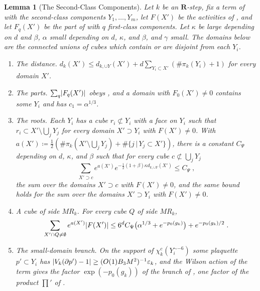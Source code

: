 \documentclass[11pt]{preprint}
\DeclarePairedDelimiter{\abs}{\lvert}{\rvert}
\numberwithin{equation}{section}
\newtheorem{lemma}{Lemma}[section]
\theoremstyle{definition}
\theoremstyle{remark}
\theoremstyle{plain}
\begin{document}
\begin{lemma}[The Second-Class Components]\label{lem:second-class}
Let $k$ be an $\mathbf R$-step, fix a term of \cite[(1.72), p.~379]{BalabanLFR2} with the second-class components $Y_1, \dots, Y_m$, let $F(X')$ be the activities of \cite[(1.91), p.~388]{BalabanLFR2}, and let $F_q(X')$ be the part of \cite[(1.91)]{BalabanLFR2} with $q$ first-class components. Let $\kappa$ be large depending on $d$ and $\beta$, $\alpha$ small depending on $d$, $\kappa$, and $\beta$, and $\gamma$ small. The domains below are the connected unions of cubes which contain or are disjoint from each $Y_i$.
\begin{enumerate}[label=(\roman*)]
\item \emph{The distance.} $d_k(X') \leq d_{k,\cup Y}(X') + d\sum_{Y_i \subset X'}(\#\pi_k(Y_i) + 1)$ for every domain $X'$.
\item \emph{The parts.} $\sum_q\abs{F_q(X')}$ obeys \cite[(1.97)]{BalabanLFR2}, and a domain with $F_0(X') \neq 0$ contains some $Y_i$ and has $c_1 = \alpha^{1/3}$.
\item \emph{The roots.} Each $Y_i$ has a cube $r_i \not\subset Y_i$ with a face on $Y_i$ such that $r_i \subset X' \setminus \bigcup_jY_j$ for every domain $X' \supset Y_i$ with $F(X') \neq 0$. With $a(X') \coloneqq \frac12(\#\pi_k(X' \setminus \bigcup_jY_j) + \#\{j \,|\, Y_j \subset X'\})$, there is a constant $C_\Psi$ depending on $d$, $\kappa$, and $\beta$ such that for every cube $c \not\subset \bigcup_jY_j$
\begin{equation}\label{eq:second-class-roots}
    \sum_{X' \supset c}e^{a(X')}e^{-\frac12(1+\beta)\kappa d_{k,\cup Y}(X')} \leq C_\Psi\;,
\end{equation}
the sum over the domains $X' \supset c$ with $F(X') \neq 0$, and the same bound holds for the sum over the domains $X' \supset Y_i$ with $F(X') \neq 0$.
\item \emph{A cube of side $MR_k$.} For every cube $Q$ of side $MR_k$,
\begin{equation}\label{eq:second-class-cube}
    \sum_{X' \cap Q \neq \emptyset}e^{a(X')}\abs{F(X')} \leq 6^dC_\Psi\bigl(\alpha^{1/3} + e^{-p_0(g_k)}\bigr) + e^{-p_0(g_k)/2}\;.
\end{equation}
\item \emph{The small-domain branch.} On the support of $\chi^c_k(Y_i^{\sim-6})$ some plaquette $p' \subset Y_i$ has $\abs{V_k(\partial p') - 1} \geq (O(1)B_3M^2)^{-1}\varepsilon_k$, and the Wilson action of the term gives the factor $\exp(-p_0(g_k))$ of the branch of \cite[p.~385, l.~45--p.~386, l.~2]{BalabanLFR2}, one factor of the product $\prod'$ of \cite[(1.79), p.~383]{BalabanLFR2}.
\end{enumerate}
\end{lemma}
\end{document}
